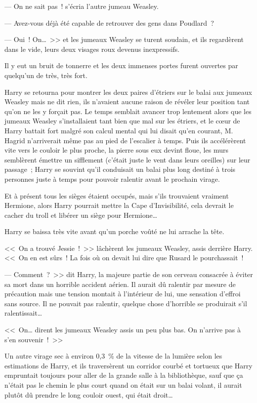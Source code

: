 --- On ne sait pas~! s'écria l'autre jumeau Weasley.

--- Avez-vous déjà été capable de retrouver des gens dans Poudlard~?

--- Oui~! On…~>> et les jumeaux Weasley se turent soudain, et ils regardèrent dans le vide, leurs deux visages roux devenus inexpressifs.

Il y eut un bruit de tonnerre et les deux immenses portes furent ouvertes par quelqu'un de très, très fort.

Harry se retourna pour montrer les deux paires d'étriers sur le balai aux jumeaux Weasley mais ne dit rien, ils n'avaient aucune raison de révéler leur position tant qu'on ne les y forçait pas. Le temps semblait avancer trop lentement alors que les jumeaux Weasley s'installaient tant bien que mal sur les étriers, et le cœur de Harry battait fort malgré son calcul mental qui lui disait qu'en courant, M. Hagrid n'arriverait même pas au pied de l'escalier à temps. Puis ils accélérèrent vite vers le couloir le plus proche, la pierre sous eux devint floue, les murs semblèrent émettre un sifflement (c'était juste le vent dans leurs oreilles) sur leur passage~; Harry se souvint qu'il conduisait un balai plus long destiné à trois personnes juste à temps pour pouvoir ralentir avant le prochain virage.

Et à présent tous les sièges étaient occupés, mais s'ils trouvaient vraiment Hermione, alors Harry pourrait mettre la Cape d'Invisibilité, cela devrait le cacher du troll et libérer un siège pour Hermione…

Harry se baissa très vite avant qu'un porche voûté ne lui arrache la tête.

<<~On a trouvé Jessie~!~>> lâchèrent les jumeaux Weasley, assis derrière Harry. <<~On en est sûrs~! La fois où on devait lui dire que Rusard le pourchassait~!

--- Comment~?~>> dit Harry, la majeure partie de son cerveau consacrée à éviter sa mort dans un horrible accident aérien. Il aurait dû ralentir par mesure de précaution mais une tension montait à l'intérieur de lui, une sensation d'effroi sans source. Il ne pouvait pas ralentir, quelque chose d'horrible se produirait s'il ralentissait…

<<~On… dirent les jumeaux Weasley assis un peu plus bas. On n'arrive pas à s'en souvenir~!~>>

Un autre virage sec à environ 0,3~\% de la vitesse de la lumière selon les estimations de Harry, et ils traversèrent un corridor courbé et tortueux que Harry empruntait toujours pour aller de la grande salle à la bibliothèque, sauf que ça n'était pas le chemin le plus court quand on était sur un balai volant, il aurait plutôt dû prendre le long couloir ouest, qui était droit…

